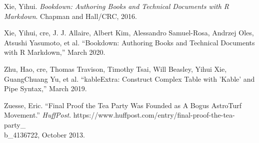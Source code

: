 \documentclass[12pt,oneside]{psthesis}
\begin{document}
\leavevmode\hypertarget{ref-xie2016bookdown}{}%
Xie, Yihui. \emph{Bookdown: Authoring Books and Technical Documents with R Markdown}. Chapman and Hall/CRC, 2016.

\leavevmode\hypertarget{ref-xie2020bookdown}{}%
Xie, Yihui, cre, J. J. Allaire, Albert Kim, Alessandro Samuel-Rosa, Andrzej Oles, Atsushi Yasumoto, et al. ``Bookdown: Authoring Books and Technical Documents with R Markdown,'' March 2020.

\leavevmode\hypertarget{ref-zhu2019kableextra}{}%
Zhu, Hao, cre, Thomas Travison, Timothy Tsai, Will Beasley, Yihui Xie, GuangChuang Yu, et al. ``kableExtra: Construct Complex Table with 'Kable' and Pipe Syntax,'' March 2019.

\leavevmode\hypertarget{ref-zuesse2013final}{}%
Zuesse, Eric. ``Final Proof the Tea Party Was Founded as A Bogus AstroTurf Movement.'' \emph{HuffPost}. https://www.huffpost.com/entry/final-proof-the-tea-party\_\\b\_4136722, October 2013.


\end{document}
